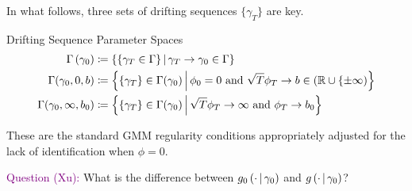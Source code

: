 \documentclass[11pt]{article}
\newcommand{\purple}[1]{\textcolor{purple}{#1}}
\newcommand*{\R}{\mathbb{R}}
\newcommand{\mvert}[1][\middle]{\ensuremath{\,#1\vert\,}}
\begin{document}
In what follows, three sets of drifting sequences $\lbrace \gamma_T \rbrace$ are key. 

\begin{defn}{Drifting Sequence Parameter Spaces}
    \begin{align}
        \Gamma\left(\gamma_0\right) &\coloneqq \left\lbrace \left\lbrace \gamma_T \in \Gamma \right\rbrace \mvert
            \gamma_T \to \gamma_0 \in \Gamma \right\rbrace\\ 
        \Gamma(\gamma_0, 0, b) &\coloneqq \left\lbrace \lbrace \gamma_T \rbrace \in \Gamma(\gamma_0) \mvert \phi_0 =
        0\ \text{and}\ \sqrt{T} \phi_T \to b \in (\R \cup \lbrace \pm \infty) \right\rbrace \\
        \Gamma(\gamma_0, \infty, b_0) &\coloneqq \left\lbrace \lbrace \gamma_T \rbrace \in \Gamma (\gamma_0) \mvert
        \sqrt{T} \phi_T \to \infty\ \text{and}\ \phi_T \to b_0 \right\rbrace 
    \end{align}
\end{defn}

These are the standard GMM regularity conditions appropriately adjusted for the lack of identification when $\phi
=0$.

\purple{Question (Xu):}
What is the difference between $g_0\left(\cdot \mvert \gamma_0\right)$ and $g\left(\cdot \mvert \gamma_0\right)$?
\end{document}
